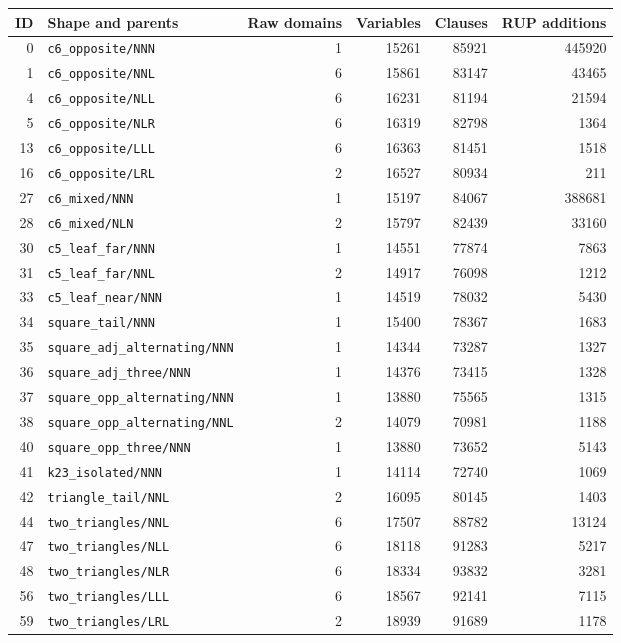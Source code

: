 \begin{longtable}{rp{}rrrr}
\toprule ID & Shape and parents & Raw domains & Variables & Clauses & RUP additions \\ \midrule\endhead
0 & \texttt{c6\_opposite/NNN} & 1 & 15261 & 85921 & 445920 \\
1 & \texttt{c6\_opposite/NNL} & 6 & 15861 & 83147 & 43465 \\
4 & \texttt{c6\_opposite/NLL} & 6 & 16231 & 81194 & 21594 \\
5 & \texttt{c6\_opposite/NLR} & 6 & 16319 & 82798 & 1364 \\
13 & \texttt{c6\_opposite/LLL} & 6 & 16363 & 81451 & 1518 \\
16 & \texttt{c6\_opposite/LRL} & 2 & 16527 & 80934 & 211 \\
27 & \texttt{c6\_mixed/NNN} & 1 & 15197 & 84067 & 388681 \\
28 & \texttt{c6\_mixed/NLN} & 2 & 15797 & 82439 & 33160 \\
30 & \texttt{c5\_leaf\_far/NNN} & 1 & 14551 & 77874 & 7863 \\
31 & \texttt{c5\_leaf\_far/NNL} & 2 & 14917 & 76098 & 1212 \\
33 & \texttt{c5\_leaf\_near/NNN} & 1 & 14519 & 78032 & 5430 \\
34 & \texttt{square\_tail/NNN} & 1 & 15400 & 78367 & 1683 \\
35 & \texttt{square\_adj\_alternating/NNN} & 1 & 14344 & 73287 & 1327 \\
36 & \texttt{square\_adj\_three/NNN} & 1 & 14376 & 73415 & 1328 \\
37 & \texttt{square\_opp\_alternating/NNN} & 1 & 13880 & 75565 & 1315 \\
38 & \texttt{square\_opp\_alternating/NNL} & 2 & 14079 & 70981 & 1188 \\
40 & \texttt{square\_opp\_three/NNN} & 1 & 13880 & 73652 & 5143 \\
41 & \texttt{k23\_isolated/NNN} & 1 & 14114 & 72740 & 1069 \\
42 & \texttt{triangle\_tail/NNL} & 2 & 16095 & 80145 & 1403 \\
44 & \texttt{two\_triangles/NNL} & 6 & 17507 & 88782 & 13124 \\
47 & \texttt{two\_triangles/NLL} & 6 & 18118 & 91283 & 5217 \\
48 & \texttt{two\_triangles/NLR} & 6 & 18334 & 93832 & 3281 \\
56 & \texttt{two\_triangles/LLL} & 6 & 18567 & 92141 & 7115 \\
59 & \texttt{two\_triangles/LRL} & 2 & 18939 & 91689 & 1178 \\
\bottomrule\end{longtable}
